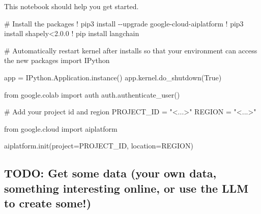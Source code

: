 \documentclass[
  letterpaper,
  DIV=11,
  numbers=noendperiod]{scrreprt}
\newenvironment{Shaded}{\begin{snugshade}}{\end{snugshade}}
\newcommand{\CommentTok}[1]{\textcolor[rgb]{0.37,0.37,0.37}{#1}}
\newcommand{\FloatTok}[1]{\textcolor[rgb]{0.68,0.00,0.00}{#1}}
\newcommand{\ImportTok}[1]{\textcolor[rgb]{0.00,0.46,0.62}{#1}}
\newcommand{\NormalTok}[1]{\textcolor[rgb]{0.00,0.23,0.31}{#1}}
\newcommand{\OperatorTok}[1]{\textcolor[rgb]{0.37,0.37,0.37}{#1}}
\newcommand{\StringTok}[1]{\textcolor[rgb]{0.13,0.47,0.30}{#1}}
\newcommand{\VariableTok}[1]{\textcolor[rgb]{0.07,0.07,0.07}{#1}}
\begin{document}
This notebook should help you get started.

\begin{Shaded}
\begin{Highlighting}[]
\CommentTok{\# Install the packages}
\OperatorTok{!}\NormalTok{ pip3 install }\OperatorTok{{-}{-}}\NormalTok{upgrade google}\OperatorTok{{-}}\NormalTok{cloud}\OperatorTok{{-}}\NormalTok{aiplatform}
\OperatorTok{!}\NormalTok{ pip3 install shapely}\OperatorTok{\textless{}}\FloatTok{2.0.0}
\OperatorTok{!}\NormalTok{ pip install langchain}
\end{Highlighting}
\end{Shaded}

\begin{Shaded}
\begin{Highlighting}[]
\CommentTok{\# Automatically restart kernel after installs so that your environment can access the new packages}
\ImportTok{import}\NormalTok{ IPython}

\NormalTok{app }\OperatorTok{=}\NormalTok{ IPython.Application.instance()}
\NormalTok{app.kernel.do\_shutdown(}\VariableTok{True}\NormalTok{)}
\end{Highlighting}
\end{Shaded}

\begin{Shaded}
\begin{Highlighting}[]
\ImportTok{from}\NormalTok{ google.colab }\ImportTok{import}\NormalTok{ auth}
\NormalTok{auth.authenticate\_user()}
\end{Highlighting}
\end{Shaded}

\begin{Shaded}
\begin{Highlighting}[]
\CommentTok{\# Add your project id and region}
\NormalTok{PROJECT\_ID }\OperatorTok{=} \StringTok{"\textless{}...\textgreater{}"}
\NormalTok{REGION }\OperatorTok{=} \StringTok{"\textless{}...\textgreater{}"}

\ImportTok{from}\NormalTok{ google.cloud }\ImportTok{import}\NormalTok{ aiplatform}

\NormalTok{aiplatform.init(project}\OperatorTok{=}\NormalTok{PROJECT\_ID, location}\OperatorTok{=}\NormalTok{REGION)}
\end{Highlighting}
\end{Shaded}

\hypertarget{todo-get-some-data-your-own-data-something-interesting-online-or-use-the-llm-to-create-some}{%
\subsection{TODO: Get some data (your own data, something interesting
online, or use the LLM to create
some!)}\label{todo-get-some-data-your-own-data-something-interesting-online-or-use-the-llm-to-create-some}}
\end{document}
